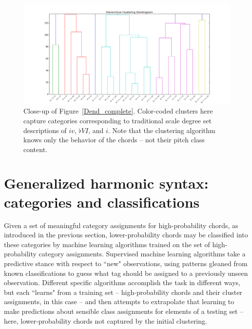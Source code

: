\begin{figure}
	\centering
	\includegraphics[width=6in]{Dend_iv_bVI_i.png}
	\caption{Close-up of Figure~\ref{Dend_complete}.  Color-coded clusters here capture categories corresponding to traditional scale degree set descriptions of $iv$, $\flat VI$, and $i$.  Note that the clustering algorithm knows only the behavior of the chords -- not their pitch class content.}
	\label{Dend_sub3}
\end{figure}


\section{Generalized harmonic syntax: categories and classifications}
Given a set of meaningful category assignments for high-probability chords, as introduced in the previous section, lower-probability chords may be classified into these categories by machine learning algorithms trained on the set of high-probability category assignments.  Supervised machine learning algorithms take a predictive stance with respect to ``new" observations, using patterns gleaned from known classifications to guess what tag should be assigned to a previously unseen observation.  Different specific algorithms accomplish the task in different ways, but each ``learns" from a training set -- high-probability chords and their cluster assignments, in this case -- and then attempts to extrapolate that learning to make predictions about sensible class assignments for elements of a testing set -- here, lower-probability chords not captured by the initial clustering.

